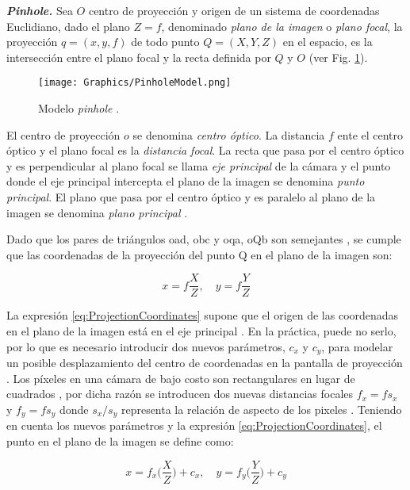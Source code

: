 \textit{\textbf{Pinhole.}} Sea $O$ centro de proyección y origen de un sistema de coordenadas Euclidiano, dado el plano $Z = f$, denominado \textit{plano de la imagen} o \textit{plano focal}, la proyección $q = (x,y,f)$ de todo punto $Q = (X,Y,Z)$ en el espacio, es la intersección entre el plano focal y la recta definida por $Q$ y $O$ (ver Fig. \ref{fig:PinholeModel}).

\begin{figure}[h!]
    \centering
    \texttt{[image: Graphics/PinholeModel.png]}
    \caption{Modelo \textit{pinhole} \cite{David}.}
    \label{fig:PinholeModel}
\end{figure}

El centro de proyección $o$ se denomina \textit{centro óptico}. La distancia $f$ ente el centro óptico y el plano focal es la \textit{distancia focal}. La recta que pasa por el centro óptico y es perpendicular al plano focal se llama \textit{eje principal} de la cámara y el punto donde el eje principal intercepta el plano de la imagen se denomina \textit{punto principal}. El plano que pasa por el centro óptico y es paralelo al plano de la imagen se denomina \textit{plano principal} \cite{David}.

Dado que los pares de triángulos oad, obc y oqa, oQb son semejantes \cite{David}, se cumple que las
coordenadas de la proyección del punto Q en el plano de la imagen son:

\begin{equation}
    x=f\frac{X}{Z}, \quad y=f\frac{Y}{Z}
    \label{eq:ProjectionCoordinates}
\end{equation}

La expresión \ref{eq:ProjectionCoordinates} supone que el origen de las coordenadas en el plano de la imagen está en el eje principal \cite{RichardAndrew}. En la práctica, puede no serlo, por lo que es necesario introducir dos nuevos parámetros, $c_x$ y $c_y$, para modelar un posible desplazamiento del centro de coordenadas en la pantalla de proyección \cite{GaryAdrian}. Los píxeles en una cámara de bajo costo son rectangulares en lugar de cuadrados \cite{GaryAdrian}, por dicha razón se introducen dos nuevas distancias focales $f_x=fs_x$ y $f_y=fs_y$ donde $s_x/s_y$ representa la relación de aspecto de los pixeles \cite{David}. Teniendo en cuenta los nuevos parámetros y la expresión \ref{eq:ProjectionCoordinates}, el punto en el plano de la imagen se define como:

\begin{equation}
    x=f_x\bigg(\frac{X}{Z}\bigg) + c_x, \quad y=f_y\bigg(\frac{Y}{Z}\bigg) + c_y
    \label{eq:ProjectionCoordinates2}
\end{equation}

